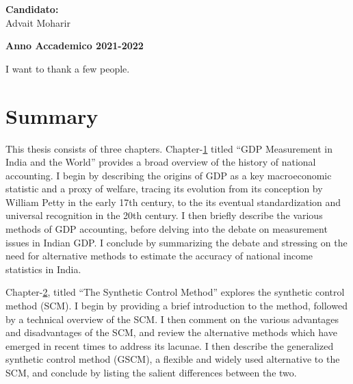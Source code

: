 \documentclass[12pt,nobind, a4paper]{reedthesis}
\begin{document}
	\hfill
	\begin{minipage}[t]{0.47\textwidth}\raggedleft
		{\large{\textbf{Candidato:}\\
				Advait Moharir}}
	\end{minipage}
	\vspace{2mm} %
	\begin{center}
		{\large{\bf Anno Accademico 2021-2022}}
	\end{center}
	\frontmatter %
	\pagestyle{empty} %
		\begin{acknowledgements}
		I want to thank a few people.
	\end{acknowledgements}
		
		\hypersetup{linkcolor=blue}
	\setcounter{secnumdepth}{2}
	\setcounter{tocdepth}{2}
	\tableofcontents
		
		\listoftables
		
		\listoffigures
		
		
		
	\mainmatter %
	\pagestyle{fancyplain} %
	
	\hypertarget{summary}{%
 \chapter*{Summary}\label{summary}}

 This thesis consists of three chapters. Chapter-\protect\hyperlink{ch1}{1} titled ``GDP Measurement in India and the World'' provides a broad overview of the history of national accounting. I begin by describing the origins of GDP as a key macroeconomic statistic and a proxy of welfare, tracing its evolution from its conception by William Petty in the early 17th century, to the its eventual standardization and universal recognition in the 20th century. I then briefly describe the various methods of GDP accounting, before delving into the debate on measurement issues in Indian GDP. I conclude by summarizing the debate and stressing on the need for alternative methods to estimate the accuracy of national income statistics in India.
 \linebreak

 Chapter-\protect\hyperlink{ch2}{2}, titled ``The Synthetic Control Method'' explores the synthetic control method (SCM). I begin by providing a brief introduction to the method, followed by a technical overview of the SCM. I then comment on the various advantages and disadvantages of the SCM, and review the alternative methods which have emerged in recent times to address its lacunae. I then describe the generalized synthetic control method (GSCM), a flexible and widely used alternative to the SCM, and conclude by listing the salient differences between the two. \linebreak
\end{document}
